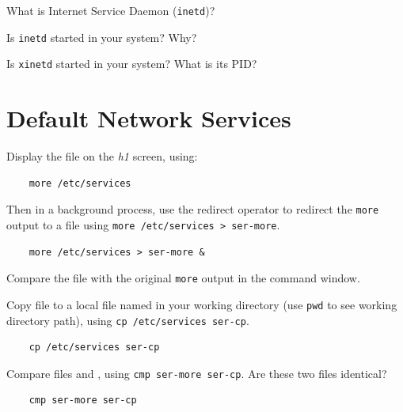 \documentclass{UTNetLab}
\begin{document}
\begin{report}
    \item What is Internet Service Daemon (\lstinline{inetd})?

    \item Is \lstinline{inetd} started in your system? Why?

    \item Is \lstinline{xinetd} started in your system? What is its PID?
\end{report}

\section{Default Network Services}
Display the file  on the \textit{h1} screen, using:

\begin{lstlisting}
	more /etc/services
\end{lstlisting}

Then in a background process, use the redirect operator to redirect the \lstinline{more} output to
a file using \lstinline{more /etc/services > ser-more}.

\begin{lstlisting}
	more /etc/services > ser-more &
\end{lstlisting}

Compare the file  with the original \lstinline{more} output in the command window.

Copy  file to a local file named  in your working directory (use \lstinline{pwd} to see working directory path),
using \lstinline{cp /etc/services ser-cp}.

\begin{lstlisting}
	cp /etc/services ser-cp
\end{lstlisting}

Compare files  and , using \lstinline{cmp ser-more ser-cp}.
Are these two files identical?

\begin{lstlisting}
	cmp ser-more ser-cp
\end{lstlisting}
\end{document}
